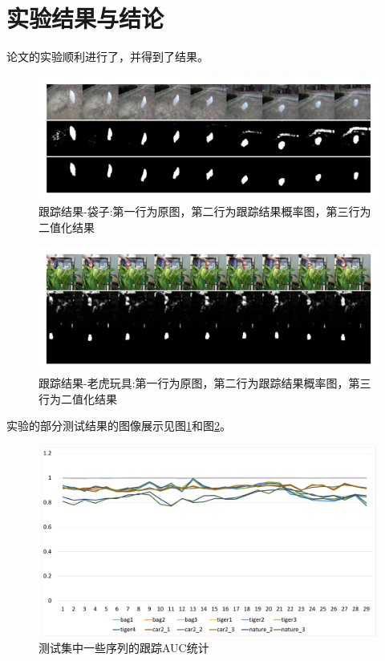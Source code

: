 \section{实验结果与结论}
论文的实验顺利进行了，并得到了结果。
\par
\begin{figure}
    \centering
    \includegraphics[width = 1.\textwidth]{chap/img/result_bag.pdf}
    \caption{跟踪结果-袋子:第一行为原图，第二行为跟踪结果概率图，第三行为二值化结果}
    \label{fig:result_bag}
\end{figure}
\par
\begin{figure}
    \centering
    \includegraphics[width = 1.\textwidth]{chap/img/result_tiger.pdf}
    \caption{跟踪结果-老虎玩具:第一行为原图，第二行为跟踪结果概率图，第三行为二值化结果}
    \label{fig:result_tiger}
\end{figure}
\par
实验的部分测试结果的图像展示见图\ref{fig:result_bag}和图\ref{fig:result_tiger}。
\par
\begin{figure}
    \centering
    \includegraphics[width = 1.\textwidth]{chap/img/res_auc.pdf}
    \caption{测试集中一些序列的跟踪AUC统计}
    \label{fig:res_auc}
\end{figure}
